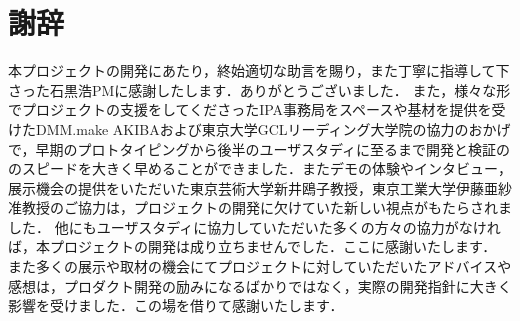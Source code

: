 \section{謝辞}
本プロジェクトの開発にあたり，終始適切な助言を賜り，また丁寧に指導して下さった石黒浩PMに感謝したします．ありがとうございました．
また，様々な形でプロジェクトの支援をしてくださったIPA事務局をスペースや基材を提供を受けたDMM.make AKIBAおよび東京大学GCLリーディング大学院の協力のおかげで，早期のプロトタイピングから後半のユーザスタディに至るまで開発と検証ののスピードを大きく早めることができました．またデモの体験やインタビュー，展示機会の提供をいただいた東京芸術大学新井鴎子教授，東京工業大学伊藤亜紗准教授のご協力は，プロジェクトの開発に欠けていた新しい視点がもたらされました．
他にもユーザスタディに協力していただいた多くの方々の協力がなければ，本プロジェクトの開発は成り立ちませんでした．ここに感謝いたします．
また多くの展示や取材の機会にてプロジェクトに対していただいたアドバイスや感想は，プロダクト開発の励みになるばかりではなく，実際の開発指針に大きく影響を受けました．この場を借りて感謝いたします．
